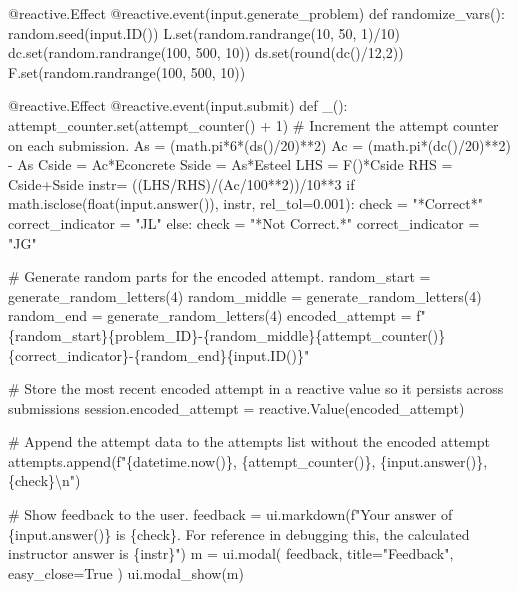 \documentclass[
  letterpaper,
  DIV=11,
  numbers=noendperiod]{scrreprt}
\newenvironment{Shaded}{\begin{snugshade}}{\end{snugshade}}
\newcommand{\NormalTok}[1]{\textcolor[rgb]{0.00,0.23,0.31}{#1}}
\begin{document}
\begin{Shaded}
\begin{Highlighting}[]
\NormalTok{    @reactive.Effect}
\NormalTok{    @reactive.event(input.generate\_problem)}
\NormalTok{    def randomize\_vars():}
\NormalTok{        random.seed(input.ID())}
\NormalTok{        L.set(random.randrange(10, 50, 1)/10)}
\NormalTok{        dc.set(random.randrange(100, 500, 10))}
\NormalTok{        ds.set(round(dc()/12,2))}
\NormalTok{        F.set(random.randrange(100, 500, 10))}
        
\NormalTok{    @reactive.Effect}
\NormalTok{    @reactive.event(input.submit)}
\NormalTok{    def \_():}
\NormalTok{        attempt\_counter.set(attempt\_counter() + 1)  \# Increment the attempt counter on each submission.}
\NormalTok{        As = (math.pi*6*(ds()/20)**2)}
\NormalTok{        Ac = (math.pi*(dc()/20)**2) {-} As}
\NormalTok{        Cside = Ac*Econcrete}
\NormalTok{        Sside = As*Esteel}
\NormalTok{        LHS = F()*Cside}
\NormalTok{        RHS = Cside+Sside}
\NormalTok{        instr= ((LHS/RHS)/(Ac/100**2))/10**3}
\NormalTok{        if math.isclose(float(input.answer()), instr, rel\_tol=0.001):}
\NormalTok{            check = "*Correct*"}
\NormalTok{            correct\_indicator = "JL"}
\NormalTok{        else:}
\NormalTok{            check = "*Not Correct.*"}
\NormalTok{            correct\_indicator = "JG"}

\NormalTok{        \# Generate random parts for the encoded attempt.}
\NormalTok{        random\_start = generate\_random\_letters(4)}
\NormalTok{        random\_middle = generate\_random\_letters(4)}
\NormalTok{        random\_end = generate\_random\_letters(4)}
\NormalTok{        encoded\_attempt = f"\{random\_start\}\{problem\_ID\}{-}\{random\_middle\}\{attempt\_counter()\}\{correct\_indicator\}{-}\{random\_end\}\{input.ID()\}"}

\NormalTok{        \# Store the most recent encoded attempt in a reactive value so it persists across submissions}
\NormalTok{        session.encoded\_attempt = reactive.Value(encoded\_attempt)}

\NormalTok{        \# Append the attempt data to the attempts list without the encoded attempt}
\NormalTok{        attempts.append(f"\{datetime.now()\}, \{attempt\_counter()\}, \{input.answer()\}, \{check\}\textbackslash{}n")}

\NormalTok{        \# Show feedback to the user.}
\NormalTok{        feedback = ui.markdown(f"Your answer of \{input.answer()\} is \{check\}. For reference in debugging this, the calculated instructor answer is \{instr\}")}
\NormalTok{        m = ui.modal(}
\NormalTok{            feedback,}
\NormalTok{            title="Feedback",}
\NormalTok{            easy\_close=True}
\NormalTok{        )}
\NormalTok{        ui.modal\_show(m)}


\end{Highlighting}
\end{Shaded}
\end{document}
